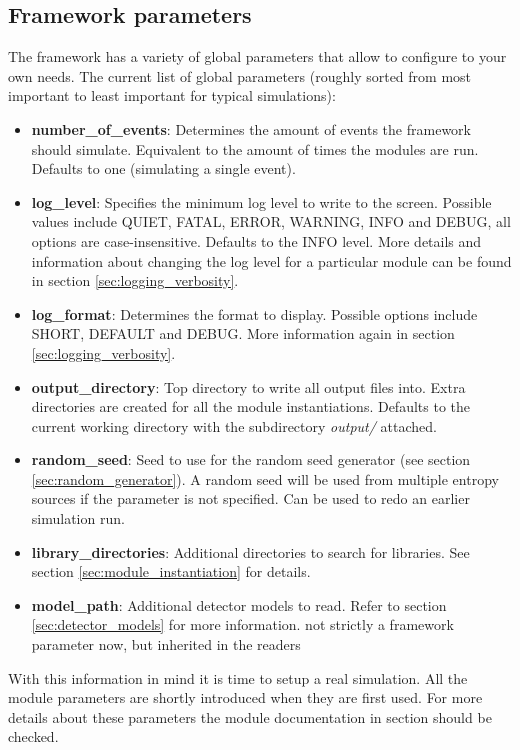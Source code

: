 \subsection{Framework parameters}
\label{sec:framework_parameters}
The framework has a variety of global parameters that allow to configure \apsq to your own needs. The current list of global parameters (roughly sorted from most important to least important for typical simulations):
\begin{itemize}
\item \textbf{number\_of\_events}: Determines the amount of events the framework should simulate. Equivalent to the amount of times the modules are run. Defaults to one (simulating a single event).
\item \textbf{log\_level}: Specifies the minimum log level to write to the screen. Possible values include QUIET, FATAL, ERROR, WARNING, INFO and DEBUG, all options are case-insensitive. Defaults to the INFO level. More details and information about changing the log level for a particular module can be found in section \ref{sec:logging_verbosity}.
\item \textbf{log\_format}: Determines the format to display. Possible options include SHORT, DEFAULT and DEBUG. More information again in section \ref{sec:logging_verbosity}.
\item \textbf{output\_directory}: Top directory to write all output files into. Extra directories are created for all the module instantiations. Defaults to the current working directory with the subdirectory \textit{output/} attached.
\item \textbf{random\_seed}: Seed to use for the random seed generator (see section \ref{sec:random_generator}). A random seed will be used from multiple entropy sources if the parameter is not specified. Can be used to redo an earlier simulation run.
\item \textbf{library\_directories}: Additional directories to search for libraries. See section \ref{sec:module_instantiation} for details.
\item \textbf{model\_path}: Additional detector models to read. Refer to section \ref{sec:detector_models} for more information. \todo not strictly a framework parameter now, but inherited in the readers \todo
\end{itemize}

With this information in mind it is time to setup a real simulation. All the module parameters are shortly introduced when they are first used. For more details about these parameters the module documentation in section \needref should be checked.

